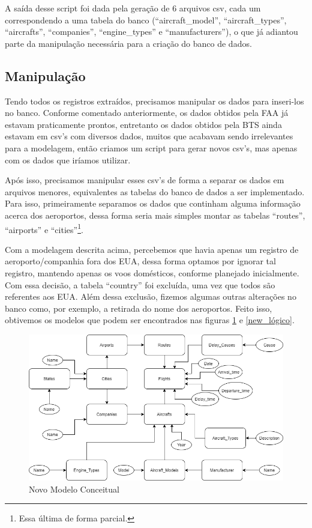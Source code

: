 \documentclass{article}
\begin{document}
	A saída desse script foi dada pela geração de 6 arquivos csv, cada um correspondendo a uma tabela do banco (``aircraft\_model'', ``aircraft\_types'', ``aircrafts'', ``companies'', ``engine\_types'' e ``manufacturers''), o que já adiantou parte da manipulação necessária para a criação do banco de dados.
	
	\subsection{Manipulação}
	
	Tendo todos os registros extraídos, precisamos manipular os dados para inseri-los no banco. Conforme comentado anteriormente, os dados obtidos pela FAA já estavam praticamente prontos, entretanto os dados obtidos pela BTS ainda estavam em csv's com diversos dados, muitos que acabavam sendo irrelevantes para a modelagem, então criamos um script para gerar novos csv's, mas apenas com os dados que iríamos utilizar.
	
	Após isso, precisamos manipular esses csv's de forma a separar os dados em arquivos menores, equivalentes as tabelas do banco de dados a ser implementado. Para isso, primeiramente separamos os dados que continham alguma informação acerca dos aeroportos, dessa forma seria mais simples montar as tabelas ``routes'', ``airports'' e ``cities''\footnote{Essa última de forma parcial.}.
	
	Com a modelagem descrita acima, percebemos que havia apenas um registro de aeroporto/companhia fora dos EUA, dessa forma optamos por ignorar tal registro, mantendo apenas os voos domésticos, conforme planejado inicialmente. Com essa decisão, a tabela ``country'' foi excluída, uma vez que todos são referentes aos EUA. Além dessa exclusão, fizemos algumas outras alterações no banco como, por exemplo, a retirada do nome dos aeroportos. Feito isso, obtivemos os modelos que podem ser encontrados nas figuras \ref{new_conceitual} e \ref{new_lógico}.
	\begin{figure}
		\centering
		\includegraphics[scale = 0.5]{Imagens/modelo conceitual.png}
		\caption{Novo Modelo Conceitual}
		\label{new_conceitual}
	\end{figure}
	
\end{document}
